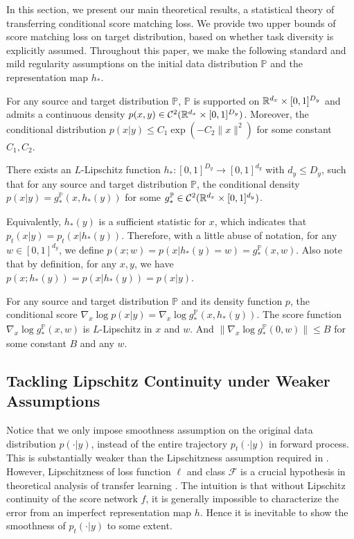 \documentclass[11pt]{article}
\numberwithin{equation}{section}
\renewcommand{\P}{\mathbb{P}}
\begin{document}
In this section, we present our main theoretical results, a statistical theory of transferring conditional score matching loss.
We provide two upper bounds of score matching loss on target distribution, based on whether task diversity  \citep{tripuraneni2020theory} is explicitly assumed.
Throughout this paper, we make the following standard and mild regularity assumptions on the initial data distribution $\P$ and the representation map $h_*$.

\begin{asp}\label{asp:sub_gaussian}
    For any source and target distribution $\P$, $\P$ is supported on $\mathbb{R}^{d_x}\times[0,1]^{D_y}$ and admits a continuous density $p(x,y)\in \mathcal{C}^2(\mathbb{R}^{d_x}\times[0,1]^{D_y})$. 
    Moreover, the conditional distribution $p(x|y)\leq C_1\exp(-C_2\|x\|^2)$ for some constant $C_1,C_2$.
\end{asp}

\begin{asp}\label{asp:low_dim}
    There exists an $L$-Lipschitz function $h_*:[0,1]^{D_y}\rightarrow[0,1]^{d_y}$ with $d_y\leq D_y$, such that for any source and target distribution $\P$, the conditional density $p(x|y)=g_*^{\P}(x,h_*(y))$ for some $g_*^{\P}\in\mathcal{C}^2(\R^{d_x}\times[0,1]^{d_y})$.
\end{asp}

Equivalently,  $h_*(y)$ is a sufficient statistic for $x$, which indicates that $p_t(x|y)=p_t(x|h_*(y))$.
Therefore, with a little abuse of notation, for any $w\in[0,1]^{d_y}$, we define $p(x;w)=p(x|h_*(y)=w)=g_*^{\P}(x,w)$. 
Also note that by definition, for any $x,y$, we have $p(x;h_*(y))=p(x|h_*(y))=p(x|y)$.

\begin{asp}\label{asp:lip}
    For any source and target distribution $\P$ and its density function $p$, the conditional score $\nabla_x\log p(x|y)=\nabla_x\log g_*^{\P}(x,h_*(y))$. The score function $\nabla_x\log g_*^{\P}(x,w)$ is $L$-Lipschitz in $x$ and $w$.
    And $\|\nabla_x\log g_*^{\P}(0,w)\|\leq B$ for some constant $B$ and any $w$.
\end{asp}

\subsection{Tackling Lipschitz Continuity under Weaker Assumptions}
Notice that we only impose smoothness assumption on the original data distribution $p(\cdot|y)$, instead of the entire trajectory $p_t(\cdot|y)$ in forward process. 
This is substantially weaker than the Lipschitzness assumption required in \citet{chen2023score,chen2022sampling,yuan2024reward,yang2024fewshot}. 
However, Lipschitzness of loss function $\ell$ and class $\mathcal{F}$ is a crucial hypothesis in theoretical analysis of transfer learning \citep{tripuraneni2020theory,chua2021fine}.
The intuition is that without Lipschitz continuity of the score network $f$, it is generally impossible to characterize the error from an imperfect representation map $h$.
Hence it is inevitable to show the smoothness of $p_t(\cdot|y)$ to some extent. 
\end{document}
